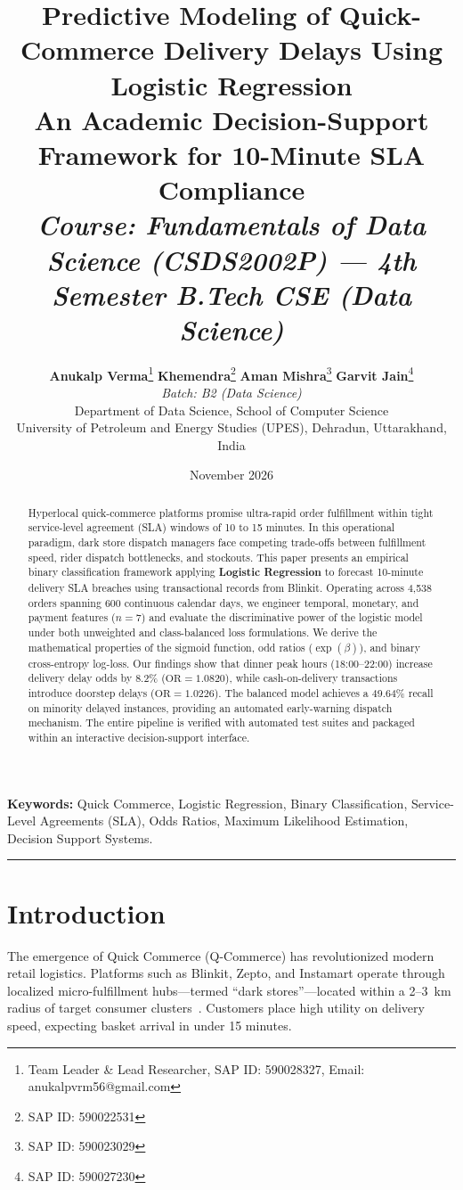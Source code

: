 \documentclass[11pt,a4paper]{article}
\title{
    \vspace{-1.5cm}
    \textbf{\huge Predictive Modeling of Quick-Commerce Delivery Delays Using Logistic Regression} \\[0.3cm]
    \large An Academic Decision-Support Framework for 10-Minute SLA Compliance \\[0.1cm]
    \normalsize \textit{Course: Fundamentals of Data Science (CSDS2002P) --- 4th Semester B.Tech CSE (Data Science)}
}
\author{
    \textbf{Anukalp Verma}\thanks{Team Leader \& Lead Researcher, SAP ID: 590028327, Email: anukalpvrm56@gmail.com} \quad
    \textbf{Khemendra}\thanks{SAP ID: 590022531} \quad
    \textbf{Aman Mishra}\thanks{SAP ID: 590023029} \quad
    \textbf{Garvit Jain}\thanks{SAP ID: 590027230} \\[0.25cm]
    \textit{Batch: B2 (Data Science)} \\[0.15cm]
    Department of Data Science, School of Computer Science \\
    University of Petroleum and Energy Studies (UPES), Dehradun, Uttarakhand, India
}
\date{November 2026}
\begin{document}
\maketitle
\thispagestyle{fancy}

\begin{abstract}
Hyperlocal quick-commerce platforms promise ultra-rapid order fulfillment within tight service-level agreement (SLA) windows of 10 to 15 minutes. In this operational paradigm, dark store dispatch managers face competing trade-offs between fulfillment speed, rider dispatch bottlenecks, and stockouts. This paper presents an empirical binary classification framework applying \textbf{Logistic Regression} to forecast 10-minute delivery SLA breaches using transactional records from Blinkit. Operating across 4,538 orders spanning 600 continuous calendar days, we engineer temporal, monetary, and payment features ($n=7$) and evaluate the discriminative power of the logistic model under both unweighted and class-balanced loss formulations. We derive the mathematical properties of the sigmoid function, odd ratios ($\exp(\beta)$), and binary cross-entropy log-loss. Our findings show that dinner peak hours (18:00--22:00) increase delivery delay odds by 8.2\% ($\text{OR} = 1.0820$), while cash-on-delivery transactions introduce doorstep delays ($\text{OR} = 1.0226$). The balanced model achieves a 49.64\% recall on minority delayed instances, providing an automated early-warning dispatch mechanism. The entire pipeline is verified with automated test suites and packaged within an interactive decision-support interface.
\end{abstract}

\noindent\textbf{Keywords:} Quick Commerce, Logistic Regression, Binary Classification, Service-Level Agreements (SLA), Odds Ratios, Maximum Likelihood Estimation, Decision Support Systems.

\vspace{0.3cm}
\hrule
\vspace{0.4cm}

\section{Introduction}
\label{sec:intro}
The emergence of Quick Commerce (Q-Commerce) has revolutionized modern retail logistics. Platforms such as Blinkit, Zepto, and Instamart operate through localized micro-fulfillment hubs—termed ``dark stores''—located within a 2--3~km radius of target consumer clusters~\cite{qcommerce2023}. Customers place high utility on delivery speed, expecting basket arrival in under 15 minutes.
\end{document}
